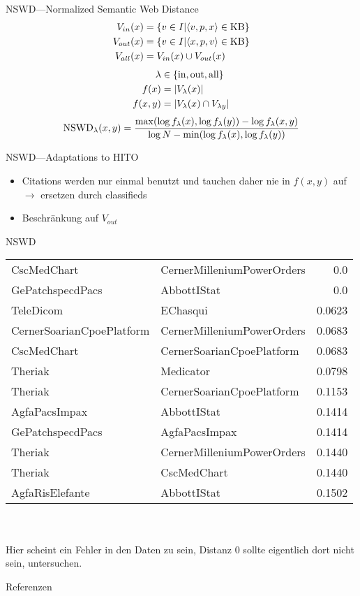 \documentclass[aspectratio=1610,handout]{beamer}
\newcommand{\f}[1]{\ensuremath{f(#1)}}
\newcommand{\fl}[1]{\ensuremath{f_{\lambda}(#1)}}
\begin{document}
\begin{frame}{NSWD---Normalized Semantic Web Distance~\cite{normalizedsemanticwebdistance}}
\begin{align*}
V_{in}(x)	&= \{v \in I| \langle v,p,x \rangle \in \textnormal{KB}\}\\
V_{out}(x)	&= \{v \in I| \langle x,p,v \rangle \in \textnormal{KB}\}\\
V_{all}(x)	&= V_{in}(x) \cup V_{out}(x)
\end{align*}
\begin{align*}
\lambda		&\in \{\textnormal{in}, \textnormal{out}, \textnormal{all}\}\\
\f{x}		&= |V_{\lambda}(x)|\\
\f{x,y}	&= |V_{\lambda}(x) \cap V_{\lambda{y}}|
\end{align*}
\[
\textnormal{NSWD}_{\lambda}(x,y) = \frac{\max(\log \fl{x}, \log \fl{y})- \log \fl{x,y}}{\log N - \min(\log \fl{x}, \log \fl{y})}
\]
\end{frame}

\begin{frame}{NSWD---Adaptations to HITO}
\begin{itemize}
\item Citations werden nur einmal benutzt und tauchen daher nie in $\f{x,y}$ auf $\rightarrow$ ersetzen durch classifieds
\item Beschränkung auf $V_{out}$
\end{itemize}
\end{frame}

\begin{frame}{NSWD}
\begin{tabular}{llr}
CscMedChart					&CernerMilleniumPowerOrders	&0.0\\
GePatchspecdPacs					&AbbottIStat	&0.0\\
TeleDicom					&EChasqui	&0.0623\\
CernerSoarianCpoePlatform					&CernerMilleniumPowerOrders	&0.0683\\
CscMedChart					&CernerSoarianCpoePlatform	&0.0683\\
Theriak					&Medicator	&0.0798\\
Theriak					&CernerSoarianCpoePlatform	&0.1153\\
AgfaPacsImpax					&AbbottIStat	&0.1414\\
GePatchspecdPacs					&AgfaPacsImpax	&0.1414\\
Theriak					&CernerMilleniumPowerOrders	&0.1440\\
Theriak					&CscMedChart	&0.1440\\
AgfaRisElefante					&AbbottIStat	&0.1502\\
\end{tabular}\\
~\\Hier scheint ein Fehler in den Daten zu sein, Distanz 0 sollte eigentlich dort nicht sein, untersuchen.
\end{frame}

\begin{frame}{Referenzen}


\end{frame}
\end{document}
